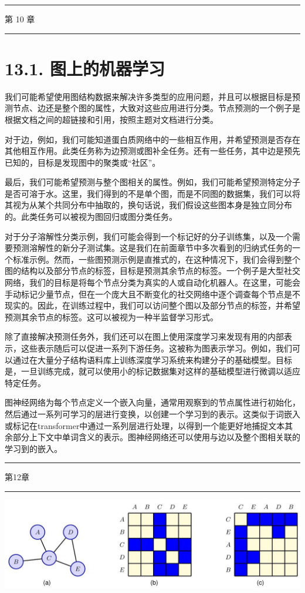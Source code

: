 \documentclass[10pt]{report}
\newcommand{\HRule}{\begin{center}\rule{0.9\linewidth}{0.2mm}\end{center}}
\begin{document}
\HRule

第 10 章

\HRule

\section*{13.1. 图上的机器学习}

我们可能希望使用图结构数据来解决许多类型的应用问题，并且可以根据目标是预测节点、边还是整个图的属性，大致对这些应用进行分类。节点预测的一个例子是根据文档之间的超链接和引用，按照主题对文档进行分类。

对于边，例如，我们可能知道蛋白质网络中的一些相互作用，并希望预测是否存在其他相互作用。此类任务称为边预测或图补全任务。还有一些任务，其中边是预先已知的，目标是发现图中的聚类或“社区”。

最后，我们可能希望预测与整个图相关的属性。例如，我们可能希望预测特定分子是否可溶于水。这里，我们得到的不是单个图，而是不同图的数据集，我们可以将其视为从某个共同分布中抽取的，换句话说，我们假设这些图本身是独立同分布的。此类任务可以被视为图回归或图分类任务。

对于分子溶解性分类示例，我们可能会得到一个标记好的分子训练集，以及一个需要预测溶解性的新分子测试集。这是我们在前面章节中多次看到的归纳式任务的一个标准示例。然而，一些图预测示例是直推式的，在这种情况下，我们会得到整个图的结构以及部分节点的标签，目标是预测其余节点的标签。一个例子是大型社交网络，我们的目标是将每个节点分类为真实的人或自动化机器人。在这里，可能会手动标记少量节点，但在一个庞大且不断变化的社交网络中逐个调查每个节点是不现实的。因此，在训练过程中，我们可以访问整个图以及部分节点的标签，并希望预测其余节点的标签。这可以被视为一种半监督学习形式。

除了直接解决预测任务外，我们还可以在图上使用深度学习来发现有用的内部表示，这些表示随后可以促进一系列下游任务。这被称为图表示学习。例如，我们可以通过在大量分子结构语料库上训练深度学习系统来构建分子的基础模型。目标是，一旦训练完成，就可以使用小的标记数据集对这样的基础模型进行微调以适应特定任务。

图神经网络为每个节点定义一个嵌入向量，通常用观察到的节点属性进行初始化，然后通过一系列可学习的层进行变换，以创建一个学习到的表示。这类似于词嵌入或标记在transformer中通过一系列层进行处理，以得到一个能更好地捕捉文本其余部分上下文中单词含义的表示。图神经网络还可以使用与边以及整个图相关联的学习到的嵌入。

\HRule

第12章

\HRule

\begin{center}
\includegraphics[max width=1.0\textwidth]{images/0194e279-9b28-703a-88f4-c3ac21e2010d_429_239_348_1305_388_0.jpg}
\end{center}
\hspace*{3em} 
\end{document}
